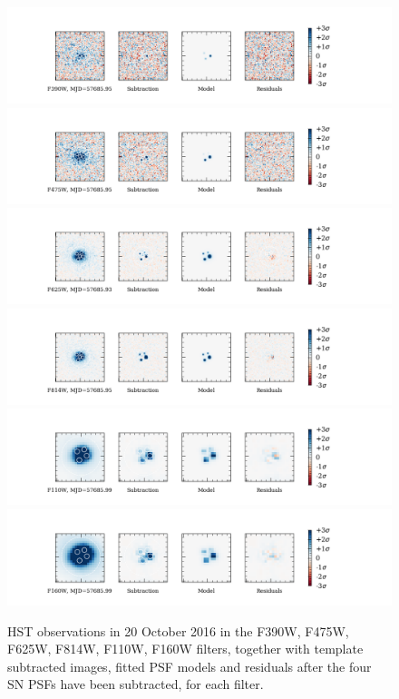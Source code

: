 \documentclass[a4paper,fleqn,usenatbib]{mnras}
\begin{document}
\begin{figure}
\centering
\includegraphics[width=\textwidth,trim={0 10mm 0 8mm},clip]{subtractions/F390W_57686.png}
\includegraphics[width=\textwidth,trim={0 10mm 0 8mm},clip]{subtractions/F475W_57686.png}
\includegraphics[width=\textwidth,trim={0 10mm 0 8mm},clip]{subtractions/F625W_57686.png}
\includegraphics[width=\textwidth,trim={0 10mm 0 8mm},clip]{subtractions/F814W_57686.png}
\includegraphics[width=\textwidth,trim={0 10mm 0 8mm},clip]{subtractions/F110W_57686.png}
\includegraphics[width=\textwidth,trim={0 10mm 0 8mm},clip]{subtractions/F160W_57686.png}
\caption{%
	HST observations in 20 October 2016 in the F390W, F475W, F625W, F814W, F110W, F160W filters, together with template subtracted images, fitted PSF models and residuals after the four SN PSFs have been subtracted, for each filter.
	\label{fig:subtractions}
}
\end{figure}
\end{document}
